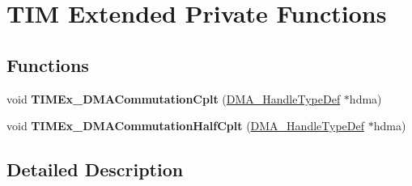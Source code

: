 \hypertarget{group___t_i_m_ex___private___functions}{}\section{T\+IM Extended Private Functions}
\label{group___t_i_m_ex___private___functions}
\subsection*{Functions}
\begin{DoxyCompactItemize}
\item 
\mbox{\label{group___t_i_m_ex___private___functions_gaf473fa38254d62a74a006a781fe0aeb8}} 
void {\bfseries T\+I\+M\+Ex\+\_\+\+D\+M\+A\+Commutation\+Cplt} (\mbox{\hyperlink{group___d_m_a___exported___types_ga41b754a906b86bce54dc79938970138b}{D\+M\+A\+\_\+\+Handle\+Type\+Def}} $\ast$hdma)
\item 
\mbox{\label{group___t_i_m_ex___private___functions_ga65b7244a1ee94cf20081543377ba8d2a}} 
void {\bfseries T\+I\+M\+Ex\+\_\+\+D\+M\+A\+Commutation\+Half\+Cplt} (\mbox{\hyperlink{group___d_m_a___exported___types_ga41b754a906b86bce54dc79938970138b}{D\+M\+A\+\_\+\+Handle\+Type\+Def}} $\ast$hdma)
\end{DoxyCompactItemize}


\subsection{Detailed Description}
